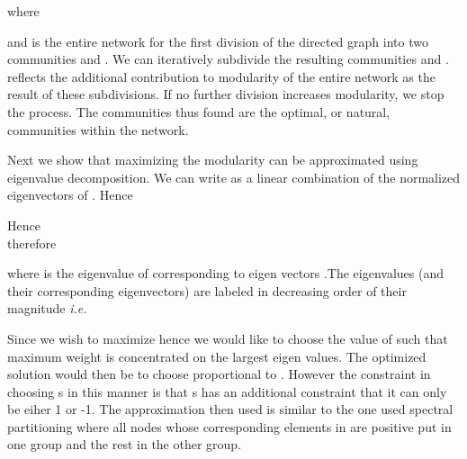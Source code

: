 \documentclass{sig-alternate}
\newcommand{\ie}{{\em i.e.}}
\begin{document}
where

and  is the entire network  for the first division of the directed graph into two communities   and . We can iteratively subdivide the resulting communities  and .   reflects the additional contribution to modularity of the entire network as the result of  these subdivisions. If no  further division increases modularity,  we stop the process. The communities thus found are the optimal, or natural, communities within the network.

Next we show that maximizing the modularity can be  approximated using eigenvalue decomposition.
We  can write  as a linear combination of the normalized eigenvectors   of  .
Hence

Hence  \\
therefore

where  is the eigenvalue of  corresponding to  eigen vectors .The eigenvalues (and their corresponding eigenvectors) are labeled in decreasing order of their magnitude  \ie


Since we wish to maximize   hence we would like to choose the value of  such that maximum weight is concentrated on the largest eigen values. The optimized solution would then be to choose  proportional to . However the constraint in choosing s in this manner is that s has an additional constraint that it can only  be eiher 1 or -1. The approximation then used is similar to the one used  spectral partitioning where all nodes whose corresponding elements in   are positive put in one group and the rest in the other group.
\end{document}
